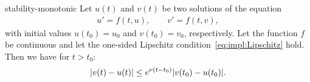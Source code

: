 \begin{Theorem}{stability-monotonic}
  Let $u(t)$ and $v(t)$ be two solutions of the equation
  \begin{gather*}
    u'=f(t,u),  \qquad v'=f(t,v),
  \end{gather*}
  with initial values $u(t_0) = u_0$ and $v(t_0) = v_0$,
  respectively. Let the function $f$ be continuous and let the
  one-sided Lipschitz condition~\eqref{eq:impl:Lipschitz} hold. Then
  we have for $t>t_0$:
  \begin{gather}
    \label{eq:implicit:3}
    \lvert v(t)-u(t)\rvert \le e^{\nu(t-t_0)} \lvert v(t_0) - u(t_0)\rvert.    
  \end{gather}
\end{Theorem}

